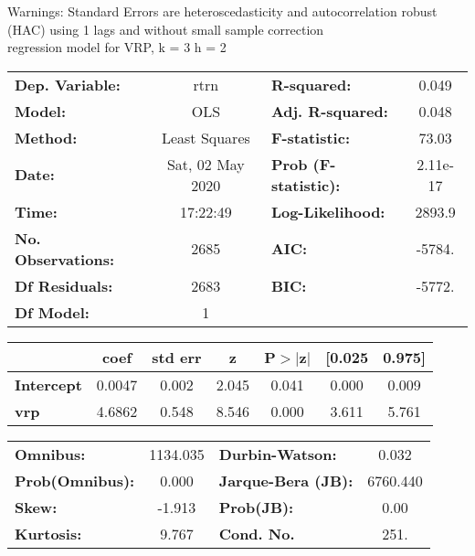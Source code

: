 Warnings: \newline
 [1] Standard Errors are heteroscedasticity and autocorrelation robust (HAC) using 1 lags and without small sample correction\\ 

regression model for VRP, k = 3 h = 2\begin{center}
\begin{tabular}{lclc}
\toprule
\textbf{Dep. Variable:}    &       rtrn       & \textbf{  R-squared:         } &     0.049   \\
\textbf{Model:}            &       OLS        & \textbf{  Adj. R-squared:    } &     0.048   \\
\textbf{Method:}           &  Least Squares   & \textbf{  F-statistic:       } &     73.03   \\
\textbf{Date:}             & Sat, 02 May 2020 & \textbf{  Prob (F-statistic):} &  2.11e-17   \\
\textbf{Time:}             &     17:22:49     & \textbf{  Log-Likelihood:    } &    2893.9   \\
\textbf{No. Observations:} &        2685      & \textbf{  AIC:               } &    -5784.   \\
\textbf{Df Residuals:}     &        2683      & \textbf{  BIC:               } &    -5772.   \\
\textbf{Df Model:}         &           1      & \textbf{                     } &             \\
\bottomrule
\end{tabular}
\begin{tabular}{lcccccc}
                   & \textbf{coef} & \textbf{std err} & \textbf{z} & \textbf{P$> |$z$|$} & \textbf{[0.025} & \textbf{0.975]}  \\
\midrule
\textbf{Intercept} &       0.0047  &        0.002     &     2.045  &         0.041        &        0.000    &        0.009     \\
\textbf{vrp}       &       4.6862  &        0.548     &     8.546  &         0.000        &        3.611    &        5.761     \\
\bottomrule
\end{tabular}
\begin{tabular}{lclc}
\textbf{Omnibus:}       & 1134.035 & \textbf{  Durbin-Watson:     } &    0.032  \\
\textbf{Prob(Omnibus):} &   0.000  & \textbf{  Jarque-Bera (JB):  } & 6760.440  \\
\textbf{Skew:}          &  -1.913  & \textbf{  Prob(JB):          } &     0.00  \\
\textbf{Kurtosis:}      &   9.767  & \textbf{  Cond. No.          } &     251.  \\
\bottomrule
\end{tabular}
\end{center}

